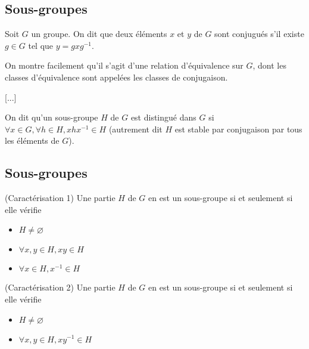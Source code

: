 \subsection{Sous-groupes}

\begin{de}
Soit $G$ un groupe. On dit que deux éléments $x$ et $y$ de $G$ sont conjugués s'il existe $g \in G$ tel que $y = gxg^{-1}$.
\end{de}

\begin{rem}
On montre facilement qu'il s'agit d'une relation d'équivalence sur $G$, dont les classes d'équivalence sont appelées les classes de conjugaison.
\end{rem}

[...]

\begin{de}
On dit qu'un sous-groupe $H$ de $G$ est distingué dans $G$ si
$\forall x \in G, \forall h \in H, xhx^{-1} \in H$
(autrement dit $H$ est stable par conjugaison par tous les éléments de $G$).
\end{de}

\subsection{Sous-groupes}

\begin{prop}
(Caractérisation 1) Une partie $H$ de $G$ en est un sous-groupe si et seulement si elle vérifie
\begin{itemize}
\item $H \neq \varnothing$
\item $\forall x,y \in H, xy \in H$
\item $\forall x \in H, x^{-1} \in H$
\end{itemize}
\end{prop}

\begin{prop}
(Caractérisation 2) Une partie $H$ de $G$ en est un sous-groupe si et seulement si elle vérifie
\begin{itemize}
\item $H \neq \varnothing$
\item $\forall x,y \in H, xy^{-1} \in H$
\end{itemize}
\end{prop}

